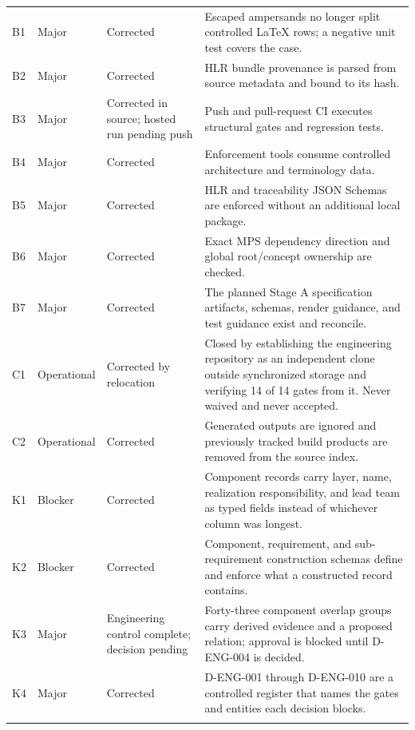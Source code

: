 \documentclass[11pt,letterpaper]{article}
\begin{document}
\begin{small}
\begin{longtable}{@{}L{0.07\textwidth}L{0.12\textwidth}L{0.31\textwidth}L{0.42\textwidth}@{}}
\addlinespace[2pt]
B1 & Major & Corrected & Escaped ampersands no longer split controlled LaTeX rows; a negative unit test covers the case. \\
\addlinespace[2pt]
B2 & Major & Corrected & HLR bundle provenance is parsed from source metadata and bound to its hash. \\
\addlinespace[2pt]
B3 & Major & Corrected in source; hosted run pending push & Push and pull-request CI executes structural gates and regression tests. \\
\addlinespace[2pt]
B4 & Major & Corrected & Enforcement tools consume controlled architecture and terminology data. \\
\addlinespace[2pt]
B5 & Major & Corrected & HLR and traceability JSON Schemas are enforced without an additional local package. \\
\addlinespace[2pt]
B6 & Major & Corrected & Exact MPS dependency direction and global root/concept ownership are checked. \\
\addlinespace[2pt]
B7 & Major & Corrected & The planned Stage A specification artifacts, schemas, render guidance, and test guidance exist and reconcile. \\
\addlinespace[2pt]
C1 & Operational & Corrected by relocation & Closed by establishing the engineering repository as an independent clone outside synchronized storage and verifying 14 of 14 gates from it. Never waived and never accepted. \\
\addlinespace[2pt]
C2 & Operational & Corrected & Generated outputs are ignored and previously tracked build products are removed from the source index. \\
\addlinespace[2pt]
K1 & Blocker & Corrected & Component records carry layer, name, realization responsibility, and lead team as typed fields instead of whichever column was longest. \\
\addlinespace[2pt]
K2 & Blocker & Corrected & Component, requirement, and sub-requirement construction schemas define and enforce what a constructed record contains. \\
\addlinespace[2pt]
K3 & Major & Engineering control complete; decision pending & Forty-three component overlap groups carry derived evidence and a proposed relation; approval is blocked until D-ENG-004 is decided. \\
\addlinespace[2pt]
K4 & Major & Corrected & D-ENG-001 through D-ENG-010 are a controlled register that names the gates and entities each decision blocks. \\
\addlinespace[2pt]

\end{longtable}
\end{small}
\end{document}

